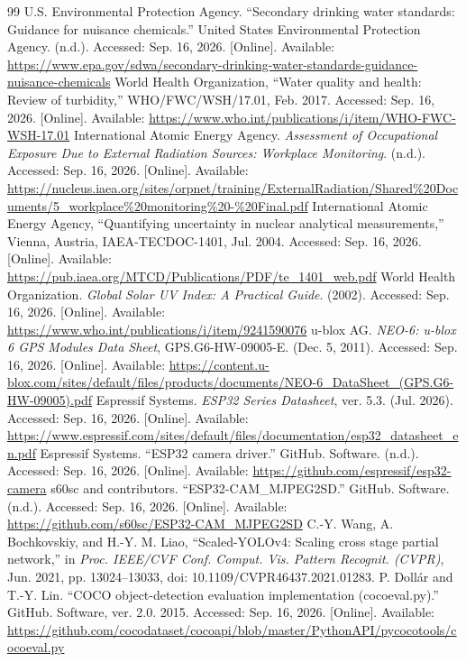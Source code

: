 \begin{thebibliography}{99}
U.S. Environmental Protection Agency. ``Secondary drinking water standards: Guidance for nuisance chemicals.'' United States Environmental Protection Agency. (n.d.). Accessed: Sep. 16, 2026. [Online]. Available: \url{https://www.epa.gov/sdwa/secondary-drinking-water-standards-guidance-nuisance-chemicals}
World Health Organization, ``Water quality and health: Review of turbidity,'' WHO/FWC/WSH/17.01, Feb. 2017. Accessed: Sep. 16, 2026. [Online]. Available: \url{https://www.who.int/publications/i/item/WHO-FWC-WSH-17.01}
International Atomic Energy Agency. \textit{Assessment of Occupational Exposure Due to External Radiation Sources: Workplace Monitoring}. (n.d.). Accessed: Sep. 16, 2026. [Online]. Available: \url{https://nucleus.iaea.org/sites/orpnet/training/ExternalRadiation/Shared\%20Documents/5_workplace\%20monitoring\%20-\%20Final.pdf}
International Atomic Energy Agency, ``Quantifying uncertainty in nuclear analytical measurements,'' Vienna, Austria, IAEA-TECDOC-1401, Jul. 2004. Accessed: Sep. 16, 2026. [Online]. Available: \url{https://pub.iaea.org/MTCD/Publications/PDF/te_1401_web.pdf}
World Health Organization. \textit{Global Solar UV Index: A Practical Guide}. (2002). Accessed: Sep. 16, 2026. [Online]. Available: \url{https://www.who.int/publications/i/item/9241590076}
u-blox AG. \textit{NEO-6: u-blox 6 GPS Modules Data Sheet}, GPS.G6-HW-09005-E. (Dec. 5, 2011). Accessed: Sep. 16, 2026. [Online]. Available: \url{https://content.u-blox.com/sites/default/files/products/documents/NEO-6_DataSheet_(GPS.G6-HW-09005).pdf}
Espressif Systems. \textit{ESP32 Series Datasheet}, ver. 5.3. (Jul. 2026). Accessed: Sep. 16, 2026. [Online]. Available: \url{https://www.espressif.com/sites/default/files/documentation/esp32_datasheet_en.pdf}
Espressif Systems. ``ESP32 camera driver.'' GitHub. Software. (n.d.). Accessed: Sep. 16, 2026. [Online]. Available: \url{https://github.com/espressif/esp32-camera}
s60sc and contributors. ``ESP32-CAM\_MJPEG2SD.'' GitHub. Software. (n.d.). Accessed: Sep. 16, 2026. [Online]. Available: \url{https://github.com/s60sc/ESP32-CAM_MJPEG2SD}
C.-Y. Wang, A. Bochkovskiy, and H.-Y. M. Liao, ``Scaled-YOLOv4: Scaling cross stage partial network,'' in \textit{Proc. IEEE/CVF Conf. Comput. Vis. Pattern Recognit. (CVPR)}, Jun. 2021, pp. 13024--13033, doi: 10.1109/CVPR46437.2021.01283.
P. Doll\'{a}r and T.-Y. Lin. ``COCO object-detection evaluation implementation (cocoeval.py).'' GitHub. Software, ver. 2.0. 2015. Accessed: Sep. 16, 2026. [Online]. Available: \url{https://github.com/cocodataset/cocoapi/blob/master/PythonAPI/pycocotools/cocoeval.py}

\end{thebibliography}
